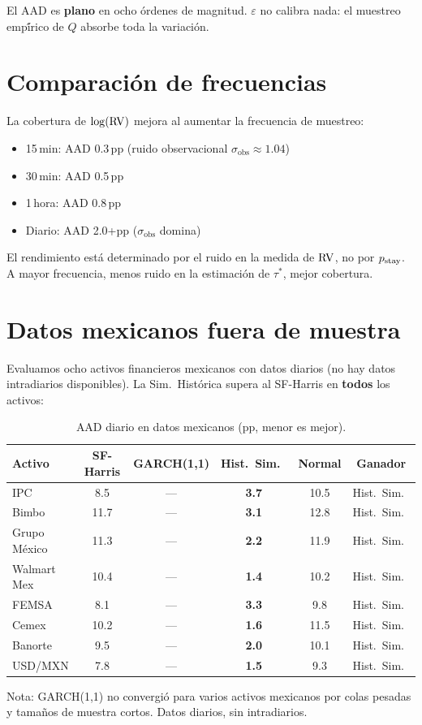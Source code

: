 El AAD es \textbf{plano} en ocho \'{o}rdenes de magnitud. $\varepsilon$ no calibra nada:
el muestreo emp\'{\'i}rico de $Q$ absorbe toda la variaci\'{o}n.

\section{Comparaci\'{o}n de frecuencias}

La cobertura de $\log(\operatorname{RV})$ mejora al aumentar la frecuencia de muestreo:
\begin{itemize}
    \item 15\,min: AAD 0.3\,pp (ruido observacional $\sigma_{\text{obs}} \approx 1.04$)
    \item 30\,min: AAD 0.5\,pp
    \item 1\,hora: AAD 0.8\,pp
    \item Diario: AAD 2.0+pp ($\sigma_{\text{obs}}$ domina)
\end{itemize}

El rendimiento est\'{a} determinado por el ruido en la medida de $\operatorname{RV}$, no por
$p_{\text{stay}}$. A mayor frecuencia, menos ruido en la estimaci\'{o}n de $\tau^*$,
mejor cobertura.

\section{Datos mexicanos fuera de muestra}

Evaluamos ocho activos financieros mexicanos con datos diarios (no hay datos
intradiarios disponibles). La Sim.\ Hist\'{o}rica supera al SF-Harris en
\textbf{todos} los activos:

\begin{table}[h]
\centering
\caption{AAD diario en datos mexicanos (pp, menor es mejor).}
\label{tab:mexican-aad}
\begin{tabular}{lccccc}
\toprule
Activo & SF-Harris & GARCH(1,1) & Hist.\ Sim.\ & Normal & Ganador \\
\midrule
IPC & 8.5 & --- & \textbf{3.7} & 10.5 & Hist.\ Sim.\ \\
Bimbo & 11.7 & --- & \textbf{3.1} & 12.8 & Hist.\ Sim.\ \\
Grupo M\'{e}xico & 11.3 & --- & \textbf{2.2} & 11.9 & Hist.\ Sim.\ \\
Walmart Mex & 10.4 & --- & \textbf{1.4} & 10.2 & Hist.\ Sim.\ \\
FEMSA & 8.1 & --- & \textbf{3.3} & 9.8 & Hist.\ Sim.\ \\
Cemex & 10.2 & --- & \textbf{1.6} & 11.5 & Hist.\ Sim.\ \\
Banorte & 9.5 & --- & \textbf{2.0} & 10.1 & Hist.\ Sim.\ \\
USD/MXN & 7.8 & --- & \textbf{1.5} & 9.3 & Hist.\ Sim.\ \\
\bottomrule
\end{tabular}
\begin{flushleft}\small
Nota: GARCH(1,1) no convergi\'{o} para varios activos mexicanos por colas pesadas
y tama\~{n}os de muestra cortos. Datos diarios, sin intradiarios.
\end{flushleft}
\end{table}

